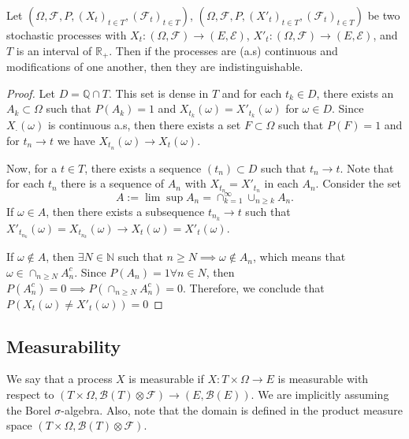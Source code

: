 \begin{proposition}
	Let
	$(\Omega, \mathcal F, P, (X_t)_{t \in T}, (\mathcal F_t)_{t\in T})$,
	$(\Omega, \mathcal F, P, (X'_t)_{t \in T}, (\mathcal F_t)_{t\in T})$
	be two stochastic processes with $X_t:(\Omega, \mathcal F) \to (E,\mathcal E)$,
	$X'_t:(\Omega, \mathcal F) \to (E,\mathcal E)$, and $T$ is an interval of $\mathbb R_+$.
	Then if the processes are (a.s) continuous and modifications of one another,
	then they are indistinguishable.
\end{proposition}
\begin{proof}
	Let $D = \mathbb Q \cap T$. This set is dense in $T$ and for each $t_k \in D$,
	there exists an $A_k \subset \Omega$ such that $P(A_k) = 1$ and $X_{t_k}(\omega) =X'_{t_k}(\omega)$
	for $\omega \in D$. Since $X_{\cdot}(\omega)$  is continuous a.s, then there
	exists a set $F\subset \Omega$ such that $P(F)=1$ and for $t_n \to t$
	we have $X_{t_n}(\omega) \to X_{t}(\omega)$.

	Now, for a $t \in T$, there exists a sequence $(t_n) \subset D$ such that
	$t_n \to t$. Note that for each $t_n$ there is a sequence of $A_n$ with
	$X_{t_n} = X'_{t_n}$ in each $A_n$. Consider the set
	\begin{displaymath}
		A := \lim \sup A_n = \cap^\infty_{k=1} \cup_{n\geq k} A_n.
	\end{displaymath}
	If $\omega \in A$, then there exists a subsequence $t_{n_k} \to t$
	such that $X'_{t_{n_k}}(\omega) = X_{t_{n_k}}(\omega)\to X_t(\omega) = X'_t(\omega)$.

	If $\omega \notin A$, then $\exists N \in \mathbb N$ such that $n \geq N \implies
		\omega \notin A_n$, which means that $\omega \in \cap_{n \geq N}A_n^c$.
	Since $P(A_n) = 1 \forall n \in N$, then $P(A_n^c) = 0 \implies P(\cap_{n\geq N} A_n^c) = 0$.
	Therefore, we conclude that $P(X_t(\omega) \neq X'_t(\omega)) = 0$
\end{proof}

\subsection{Measurability}

\begin{definition}
	We say that a process $X$ is measurable if $X: T \times \Omega \to E$ is
	measurable with respect to $(T \times \Omega, \mathcal B(T) \otimes \mathcal F) \to (E, \mathcal B(E))$.
	We are implicitly assuming the Borel $\sigma$-algebra. Also, note that
	the domain is defined in the product measure space $(T \times \Omega, \mathcal B(T) \otimes \mathcal F)$.
\end{definition}

